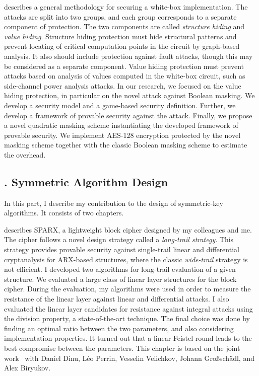 \textbf{} describes a general methodology for securing a white-box implementation. The attacks are split into two groups, and each group corresponds to a separate component of protection. The two components are called \emph{structure hiding} and \emph{value hiding}. Structure hiding protection must hide structural patterns and prevent locating of critical computation points in the circuit by graph-based analysis. It also should include protection against fault attacks, though this may be considered as a separate component. Value hiding protection must prevent  attacks based on analysis of values computed in the white-box circuit, such as side-channel power analysis attacks. In our research, we focused on the value hiding protection, in particular on the novel attack against Boolean masking. We develop a security model and a game-based security definition. Further, we develop a framework of provable security against the attack. Finally, we propose a novel quadratic masking scheme instantiating the developed framework of provable security. We implement AES-128 encryption protected by the novel masking scheme together with the classic Boolean masking scheme to estimate the overhead.


\subsection{. Symmetric Algorithm Design}

In this part, I describe my contribution to the design of symmetric-key algorithms. It consists of two chapters.

\textbf{} describes SPARX, a lightweight block cipher designed by my colleagues and me. The cipher follows a novel design strategy called a \emph{long-trail strategy}. This strategy provides provable security against single-trail linear and differential cryptanalysis for ARX-based structures, where the classic \emph{wide-trail} strategy is not efficient. I developed two algorithms for long-trail evaluation of a given structure. We evaluated a large class of linear layer structures for the block cipher. During the evaluation, my algorithms were used in order to measure the resistance of the linear layer against linear and differential attacks. I also evaluated the linear layer candidates for resistance against integral attacks using the division property, a state-of-the-art technique. The final choice was done by finding an optimal ratio between the two parameters, and also considering implementation properties. It turned out that a linear Feistel round leads to the best compromise between the parameters. This chapter is based on the joint work~\cite{OurSPARX} with Daniel Dinu, Léo Perrin, Vesselin Velichkov, Johann Großschädl, and Alex Biryukov.

